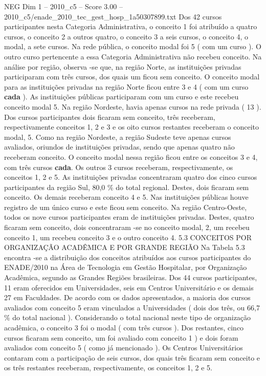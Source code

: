 \begin{textsample}{NEG Dim 1 – 2010\_c5 – Score 3.00 – 2010\_c5/enade\_2010\_tec\_gest\_hosp\_1a50307899.txt}
Dos 42 cursos participantes nesta Categoria Administrativa, o conceito 1 foi atribuído a quatro cursos, o conceito 2 a outros quatro, o conceito 3 a seis cursos, o conceito 4, o modal, a sete cursos.
Na rede pública, o conceito modal foi 5 ( com um curso ).
O outro curso pertencente a essa Categoria Administrativa não recebeu conceito.
Na análise por região, observa -se que, na região Norte, as instituições privadas participaram com três cursos, dos quais um ficou sem conceito.
O conceito modal para as instituições privadas na região Norte ficou entre 3 e 4 ( com um curso \textbf{cada} ).
As instituições públicas participaram com um curso e este recebeu conceito modal 5.
Na região Nordeste, havia apenas cursos na rede privada ( 13 ).
Dos cursos participantes dois ficaram sem conceito, três receberam, respectivamente conceitos 1, 2 e 3 e os oito cursos restantes receberam o conceito modal, 5.
Como na região Nordeste, a região Sudeste teve apenas cursos avaliados, oriundos de instituições privadas, sendo que apenas quatro não receberam conceito.
O conceito modal nessa região ficou entre os conceitos 3 e 4, com três cursos \textbf{cada}.
Os outros 3 cursos receberam, respectivamente, os conceitos 1, 2 e 5.
As instituições privadas concentraram quatro dos cinco cursos participantes da região Sul, 80,0 \% do total regional.
Destes, dois ficaram sem conceito.
Os demais receberam conceito 4 e 5.
Nas instituições públicas houve registro de um único curso e este ficou sem conceito.
Na região Centro-Oeste, todos os nove cursos participantes eram de instituições privadas.
Destes, quatro ficaram sem conceito, dois concentraram -se no conceito modal, 2, um recebeu conceito 1, um recebeu conceito 3 e o outro conceito 4. 5.3 CONCEITOS POR ORGANIZAÇÃO ACADÊMICA E POR GRANDE REGIÃO Na Tabela 5.3 encontra -se a distribuição dos conceitos atribuídos aos cursos participantes do ENADE/2010 na Área de Tecnologia em Gestão Hospitalar, por Organização Acadêmica, segundo as Grandes Regiões brasileiras.
Dos 44 cursos participantes, 11 eram oferecidos em Universidades, seis em Centros Universitário e os demais 27 em Faculdades.
De acordo com os dados apresentados, a maioria dos cursos avaliados com conceito 5 eram vinculados a Universidades ( dois dos três, ou 66,7 \% do total nacional ).
Considerando o total nacional neste tipo de organização acadêmica, o conceito 3 foi o modal ( com três cursos ).
Dos restantes, cinco cursos ficaram sem conceito, um foi avaliado com conceito 1 ) e dois foram avaliados com conceito 5 ( como já mencionado ).
Os Centros Universitários contaram com a participação de seis cursos, dos quais três ficaram sem conceito e os três restantes receberam, respectivamente, os conceitos 1, 2 e 5.

\end{textsample}
